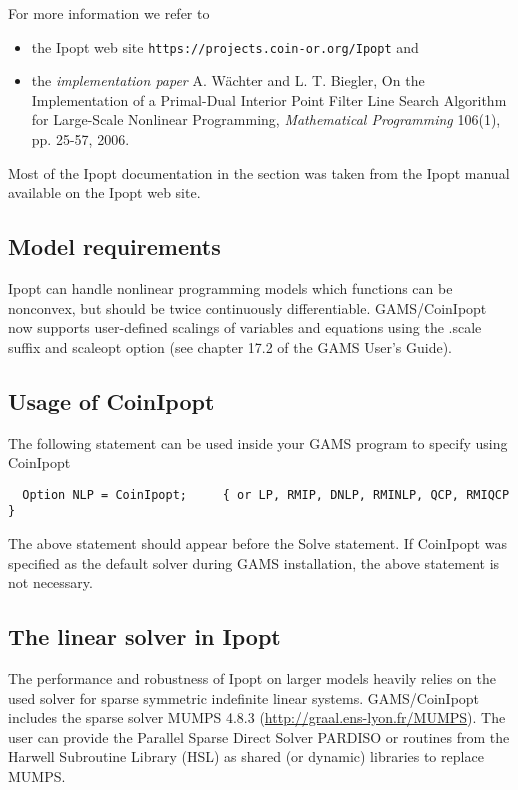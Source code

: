 For more information we refer to
\begin{itemize}
\item the Ipopt web site \texttt{https://projects.coin-or.org/Ipopt} and
\item the \emph{implementation paper} A. W\"achter and L. T. Biegler, On the Implementation of a Primal-Dual Interior Point Filter Line Search Algorithm for Large-Scale Nonlinear Programming, \emph{Mathematical Programming} 106(1), pp. 25-57, 2006.
\end{itemize}
Most of the Ipopt documentation in the section was taken from the Ipopt manual available on the Ipopt web site.

\subsection{Model requirements}

Ipopt can handle nonlinear programming models which functions can be nonconvex, but should be twice continuously differentiable.
GAMS/CoinIpopt now supports user-defined scalings of variables and equations using the .scale suffix and scaleopt option (see chapter 17.2 of the GAMS User's Guide).

\subsection{Usage of CoinIpopt}

The following statement can be used inside your GAMS program to specify using CoinIpopt
\begin{verbatim}
  Option NLP = CoinIpopt;     { or LP, RMIP, DNLP, RMINLP, QCP, RMIQCP }
\end{verbatim}

The above statement should appear before the Solve statement.
If CoinIpopt was specified as the default solver during GAMS installation, the above statement is not necessary.

\subsection{The linear solver in Ipopt}
\label{ipoptlinearsolver}
\hypertarget{ipoptlinearsolver}{}

The performance and robustness of Ipopt on larger models heavily relies on the used solver for sparse symmetric indefinite linear systems.
GAMS/CoinIpopt includes the sparse solver MUMPS 4.8.3 (\url{http://graal.ens-lyon.fr/MUMPS}).
The user can provide the Parallel Sparse Direct Solver PARDISO or routines from the Harwell Subroutine Library (HSL) as shared (or dynamic) libraries to replace MUMPS.

